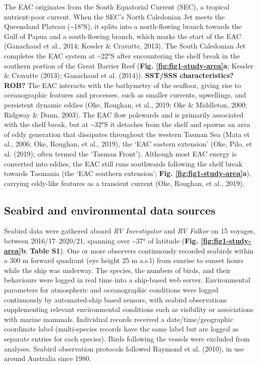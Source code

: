 \documentclass{article}
\begin{document}
The EAC originates from the South Equatorial Current (SEC), a tropical nutrient-poor current. When the SEC's North Caledonian Jet meets the Queensland Plateau (\textasciitilde18°S), it splits into a north-flowing branch towards the Gulf of Papua and a south-flowing branch, which marks the start of the EAC (Ganachaud et al., 2014; Kessler \& Cravatte, 2013). The South Caledonian Jet completes the EAC system at \textasciitilde22°S after encountering the shelf break in the southern portion of the Great Barrier Reef (\textbf{Fig. \ref{fig:fig1-study-area}a}; Kessler \& Cravatte (2013); Ganachaud et al. (2014)). \textbf{SST/SSS characteristics? ROB?} The EAC interacts with the bathymetry of the seafloor, giving rise to oceanographic features and processes, such as smaller currents, upwellings, and persistent dynamic eddies (Oke, Roughan, et al., 2019; Oke \& Middleton, 2000; Ridgway \& Dunn, 2003). The EAC flow polewards and is primarily associated with the shelf break, but at \textasciitilde32°S it detaches from the shelf and spawns an area of eddy generation that dissipates throughout the western Tasman Sea (Mata et al., 2006; Oke, Roughan, et al., 2019), the `EAC eastern extension' (Oke, Pilo, et al. (2019); often termed the `Tasman Front'). Although most EAC energy is converted into eddies, the EAC still runs southwards following the shelf break towards Tasmania (the `EAC southern extension'; \textbf{Fig. \ref{fig:fig1-study-area}a}), carrying eddy-like features as a transient current (Oke, Roughan, et al., 2019).

\hypertarget{seabird-and-environmental-data-sources}{%
\subsection{Seabird and environmental data sources}\label{seabird-and-environmental-data-sources}}

Seabird data were gathered aboard \emph{RV Investigator} and \emph{RV Falkor} on 15 voyages, between 2016/17--2020/21, spanning over \textasciitilde37° of latitude (\textbf{Fig. \ref{fig:fig1-study-area}b}; \textbf{Table S1}). One or more observers continuously recorded seabirds within a 300 m forward quadrant (eye height 25 m a.s.l) from sunrise to sunset hours while the ship was underway. The species, the numbers of birds, and their behaviours were logged in real time into a ship-based web server. Environmental parameters for atmospheric and oceanographic conditions were logged continuously by automated-ship based sensors, with seabird observations supplementing relevant environmental conditions such as visibility or associations with marine mammals. Individual records received a date/time/geographic coordinate label (multi-species records have the same label but are logged as separate entries for each species). Birds following the vessels were excluded from analyses. Seabird observation protocols followed Raymond et al. (2010), in use around Australia since 1980.
\end{document}
